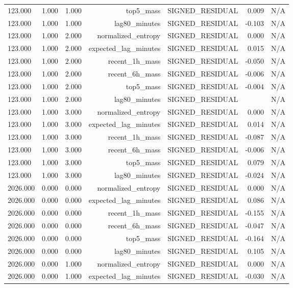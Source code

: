 \begin{table}[h!]
\begin{tabular}{lrrrrrr}
123.000 & 1.000 & 1.000 & top5\_mass & SIGNED\_RESIDUAL & 0.009 & N/A \\
123.000 & 1.000 & 1.000 & lag80\_minutes & SIGNED\_RESIDUAL & -0.103 & N/A \\
123.000 & 1.000 & 2.000 & normalized\_entropy & SIGNED\_RESIDUAL & 0.000 & N/A \\
123.000 & 1.000 & 2.000 & expected\_lag\_minutes & SIGNED\_RESIDUAL & 0.015 & N/A \\
123.000 & 1.000 & 2.000 & recent\_1h\_mass & SIGNED\_RESIDUAL & -0.050 & N/A \\
123.000 & 1.000 & 2.000 & recent\_6h\_mass & SIGNED\_RESIDUAL & -0.006 & N/A \\
123.000 & 1.000 & 2.000 & top5\_mass & SIGNED\_RESIDUAL & -0.004 & N/A \\
123.000 & 1.000 & 2.000 & lag80\_minutes & SIGNED\_RESIDUAL &  & N/A \\
123.000 & 1.000 & 3.000 & normalized\_entropy & SIGNED\_RESIDUAL & 0.000 & N/A \\
123.000 & 1.000 & 3.000 & expected\_lag\_minutes & SIGNED\_RESIDUAL & 0.014 & N/A \\
123.000 & 1.000 & 3.000 & recent\_1h\_mass & SIGNED\_RESIDUAL & -0.087 & N/A \\
123.000 & 1.000 & 3.000 & recent\_6h\_mass & SIGNED\_RESIDUAL & -0.006 & N/A \\
123.000 & 1.000 & 3.000 & top5\_mass & SIGNED\_RESIDUAL & 0.079 & N/A \\
123.000 & 1.000 & 3.000 & lag80\_minutes & SIGNED\_RESIDUAL & -0.024 & N/A \\
2026.000 & 0.000 & 0.000 & normalized\_entropy & SIGNED\_RESIDUAL & 0.000 & N/A \\
2026.000 & 0.000 & 0.000 & expected\_lag\_minutes & SIGNED\_RESIDUAL & 0.086 & N/A \\
2026.000 & 0.000 & 0.000 & recent\_1h\_mass & SIGNED\_RESIDUAL & -0.155 & N/A \\
2026.000 & 0.000 & 0.000 & recent\_6h\_mass & SIGNED\_RESIDUAL & -0.047 & N/A \\
2026.000 & 0.000 & 0.000 & top5\_mass & SIGNED\_RESIDUAL & -0.164 & N/A \\
2026.000 & 0.000 & 0.000 & lag80\_minutes & SIGNED\_RESIDUAL & 0.105 & N/A \\
2026.000 & 0.000 & 1.000 & normalized\_entropy & SIGNED\_RESIDUAL & 0.000 & N/A \\
2026.000 & 0.000 & 1.000 & expected\_lag\_minutes & SIGNED\_RESIDUAL & -0.030 & N/A \\

\end{tabular}
\end{table}
